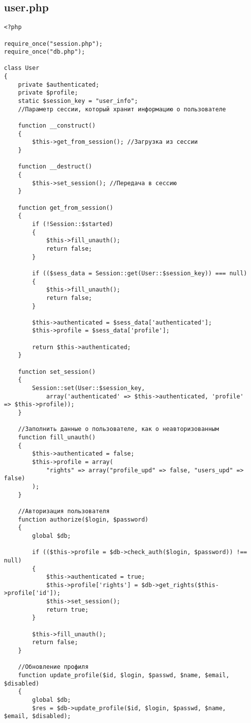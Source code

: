 \documentclass[a4paper]{article}
\begin{document}
\subsection{user.php}
\begin{verbatim}
<?php

require_once("session.php");
require_once("db.php");

class User
{
	private $authenticated;
    private $profile;
    static $session_key = "user_info";
    //Параметр сессии, который хранит информацию о пользователе
    
    function __construct()
    {
        $this->get_from_session(); //Загрузка из сессии
    }

    function __destruct()
    {
        $this->set_session(); //Передача в сессию
    }

	function get_from_session()
	{
		if (!Session::$started)
        {
            $this->fill_unauth();
            return false;
        }

        if (($sess_data = Session::get(User::$session_key)) === null)
        {
            $this->fill_unauth();
            return false;
        }

        $this->authenticated = $sess_data['authenticated'];
        $this->profile = $sess_data['profile'];

        return $this->authenticated;
	}

	function set_session()
	{
		Session::set(User::$session_key,
            array('authenticated' => $this->authenticated, 'profile' => $this->profile));
	}

    //Заполнить данные о пользователе, как о неавторизованным   
    function fill_unauth()
    {
        $this->authenticated = false;
        $this->profile = array(
            "rights" => array("profile_upd" => false, "users_upd" => false)
        );
    }

    //Авторизация пользователя
    function authorize($login, $password)
    {
        global $db;

        if (($this->profile = $db->check_auth($login, $password)) !== null)
        {
            $this->authenticated = true;
            $this->profile['rights'] = $db->get_rights($this->profile['id']);
            $this->set_session();
            return true;
        }

        $this->fill_unauth();
        return false;
    }

    //Обновление профиля    
    function update_profile($id, $login, $passwd, $name, $email, $disabled)
    {
        global $db;
        $res = $db->update_profile($id, $login, $passwd, $name, $email, $disabled);
        

\end{verbatim}
\end{document}
